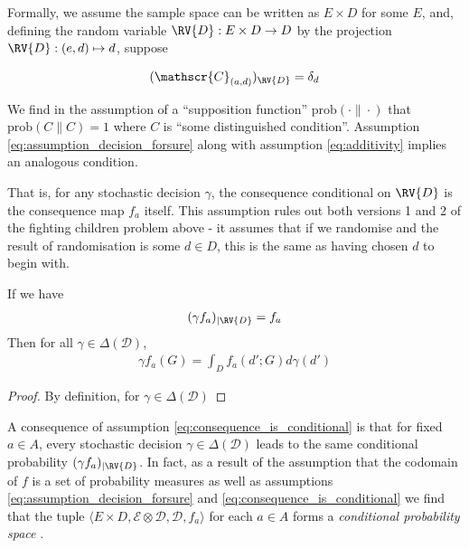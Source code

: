 Formally, we assume the sample space can be written as $E\times D$ for some $E$, and, defining the random variable $\RV{D}:E\times D\to D$ by the projection $\RV{D}:(e,d)\mapsto d$, suppose

\begin{align}
	(\mathscr{C}_{(a,d)})_{\RV{D}} = \delta_d \label{eq:assumption_decision_forsure}
\end{align}

We find in \cite{joyce_why_2000} the assumption of a ``supposition function'' $\mathrm{prob}(\cdot\|\cdot)$ that $\mathrm{prob}(C\|C)=1$ where $C$ is ``some distinguished condition''. Assumption \ref{eq:assumption_decision_forsure} along with assumption \ref{eq:additivity} implies an analogous condition.

\begin{theorem}[[Decision determinism implies decision certainty]
		
\end{theorem}

That is, for any stochastic decision $\gamma$, the consequence conditional on $\RV{D}$ is the consequence map $f_a$ itself. This assumption rules out both versions 1 and 2 of the fighting children problem above - it assumes that if we randomise and the result of randomisation is some $d\in D$, this is the same as having chosen $d$ to begin with.

\begin{lemma}
If we have 
\begin{align}
(\gamma f_{a})_{|\RV{D}} = f_a
\end{align}
Then for all $\gamma\in \Delta(\mathcal{D})$,
\begin{align}
\gamma f_a (G) = \int_D f_a(d';G) d\gamma(d')
\end{align}
\end{lemma}

\begin{proof}
By definition, for $\gamma\in \Delta(\mathcal{D})$
\end{proof}

A consequence of assumption \ref{eq:consequence_is_conditional} is that for fixed $a\in A$, every stochastic decision $\gamma\in \Delta(\mathcal{D})$ leads to the same conditional probability $(\gamma f_{a})_{|\RV{D}}$. In fact, as a result of the assumption that the codomain of $f$ is a set of probability measures as well as assumptions \ref{eq:assumption_decision_forsure} and \ref{eq:consequence_is_conditional} we find that the tuple $\langle E\times D, \mathcal{E}\otimes\mathcal{D}, \mathcal{D}, f_a\rangle$ for each $a\in A$ forms a \emph{conditional probability space} \citep{renyi_new_1955}.



